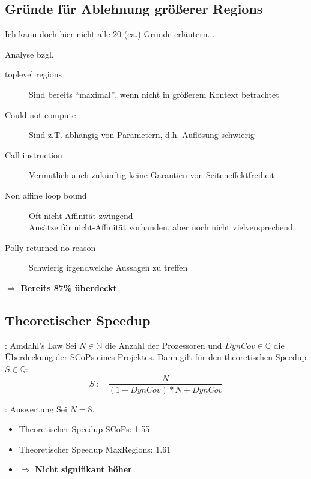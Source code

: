 \documentclass[aspectratio=169, xcolor=dvipsnames]{beamer}
\begin{document}
\subsection{Gründe für Ablehnung größerer Regions}
\begin{frame}{\subsecname}
    Ich kann doch hier nicht alle 20 (ca.) Gründe erläutern...
\end{frame}
\begin{frame}{\subsecname}
    \vspace{-0.2cm}
    \begin{figure}[!h]
        
     \end{figure}
\end{frame}
\begin{frame}{Analyse bzgl. \subsecname}
    \begin{description}
        \item[toplevel regions]Sind bereits \enquote{maximal}, wenn nicht in größerem Kontext betrachtet
        \item[Could not compute]Sind z.T. abhängig von Parametern, d.h. Auflösung schwierig
        \item[Call instruction]Vermutlich auch zukünftig keine Garantien von Seiteneffektfreiheit
        \item[Non affine loop bound]Oft nicht-Affinität zwingend\\
            Ansätze für nicht-Affinität vorhanden, aber noch nicht vielversprechend
        \item[Polly returned no reason]Schwierig irgendwelche Aussagen zu treffen
    \end{description}
    \(\Rightarrow\) \textbf{Bereits 87\% überdeckt}
\end{frame}
\subsection{Theoretischer Speedup}
\begin{frame}{\subsecname: Amdahl's Law}
    Sei \(N\in\mathbb{N}\) die Anzahl der Prozessoren und \(DynCov\in\mathbb{Q}\) die Überdeckung der SCoPs eines Projektes. Dann gilt für den theoretischen Speedup \(S\in\mathbb{Q}\):
    \Huge{\[S := \frac{N}{(1-DynCov)*N+DynCov}\]}
\end{frame}
\begin{frame}{\subsecname: Auswertung}
    Sei \(N=8\).
    \begin{itemize}
        \item Theoretischer Speedup SCoPs: 1.55
        \item Theoretischer Speedup MaxRegions: 1.61
        \item \(\Rightarrow\) \textbf{Nicht signifikant höher}
    \end{itemize}
\end{frame}
\end{document}
